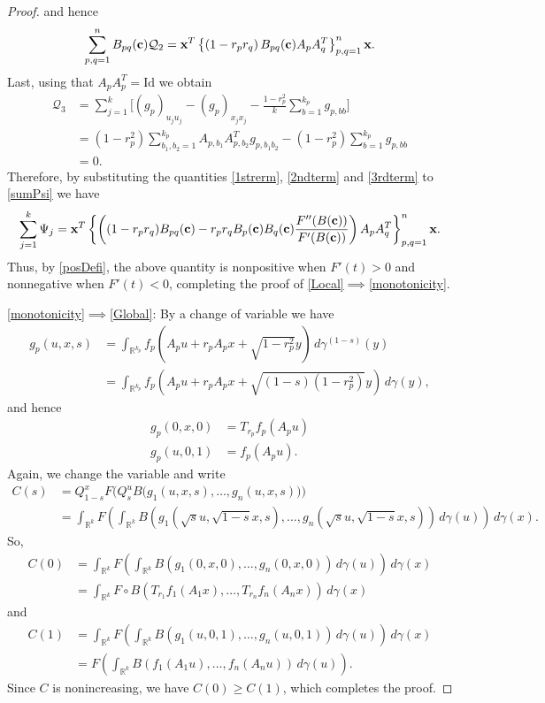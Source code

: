 \documentclass[9pt, a4paper]{amsart}
\newcommand{\R}{\mathbb{R}}
\newcommand{\1}{{\chi_{}}}%
\numberwithin{equation}{section}
\begin{document}
\begin{proof}
and hence
\begin{align}\label{2ndterm}
\sum_{p,q=1}^{n}B_{pq}({\bf{c}})\mathcal{Q}_2={\bf{x}}^T\left\{\left( 1-r_pr_q\right)B_{pq}({\bf{c}})A_pA_q^T  \right\}_{p,q=1}^n{\bf{x}}.
\end{align}
Last, using that $A_pA^T_p=\mathrm{Id}$ we obtain
\begin{align}\label{3rdterm}
	\mathcal{Q}_3&= \sum_{j=1}^k\Big[(g_p)_{u_ju_j}-(g_p)_{x_jx_j}-\frac{1-r_p^2}{k}\sum_{b=1}^{k_p}g_{p,bb}\Big]\\
	&\nonumber=(1-r_p^2)\sum_{b_1, b_2=1}^{k_p} A_{p,b_1}A_{p,b_2}^T g_{p,b_1b_2}-(1-r_p^2)\sum_{b=1}^{k_p}g_{p,bb}\\
	&\nonumber=0.
\end{align}
Therefore, by substituting the quantities \eqref{1strerm}, \eqref{2ndterm} and \eqref{3rdterm} to \eqref{sumPsi} we have
\begin{equation*}
\sum_{j=1}^k\Psi_j={\bf{x}}^T\left\{\left((1-r_pr_q)B_{pq}({\bf{c}})-r_pr_q B_{p}({\bf{c}})B_{q}({\bf{c}}) \frac{F''(B({\bf{c}}))}{F'(B({\bf{c}}))}\right)A_pA_q^T  \right\}_{p,q=1}^n{\bf{x}}.
\end{equation*}
Thus, by \eqref{posDefi}, the above quantity is nonpositive when $F'(t) > 0$ and nonnegative when $F'(t) < 0$, completing the proof of \eqref{Local}$\implies$\eqref{monotonicity}.
		
		\vspace{0.2cm}
		
		\eqref{monotonicity}$\implies$\eqref{Global}:  	By a change of variable we have
		\begin{align*}
g_p(u,x,s)&=\int_{\mathbb{R}^{k_p}} f_p(A_p u + r_p A_p x + \sqrt{1 - r_p^2} y) \, d\gamma^{(1-s)}(y)\\
&=\int_{\R^{k_p}}f_p(A_pu+r_pA_px+\sqrt{(1-s)(1-r_p^2)}y)\,d\gamma (y),
		\end{align*}
and hence  
		\begin{align*}
			g_p(0,x,0)&=T_{r_p}f_p(A_pu)\\
			g_p(u,0,1)&=f_p(A_pu).
		\end{align*}
Again, we change the variable and write
		\begin{align*}
			C(s)&=Q_{1-s}^x F\big(Q_s^uB\big(g_1(u,x,s),\ldots,g_n(u,x,s)\big)\big)\\
			&=\int_{\R^k}F\left(\int_{\R^k}B(g_1(\sqrt{s}u,\sqrt{1-s}x,s),\ldots,g_n(\sqrt{s}u,\sqrt{1-s}x,s))\,d\gamma(u)\right)\,d\gamma(x).
		\end{align*}
		So,
		\begin{align*}
			C(0)&=\int_{\R^k}F\left(\int_{\R^k}B(g_1(0,x,0),\ldots,g_n(0,x,0))\,d\gamma(u)\right)\,d\gamma(x)\\
			&=\int_{\R^k}F\circ B(T_{r_1}f_1(A_1x),\ldots,T_{r_n}f_n(A_nx))\,d\gamma(x)
		\end{align*}
		and
		\begin{align*}
			C(1)&=\int_{\R^k}F\left(\int_{\R^k}B(g_1(u,0,1),\ldots,g_n(u,0,1))\,d\gamma(u)\right)\,d\gamma(x)\\
			&=F\left(\int_{\R^k}B(f_1(A_1u),\ldots,f_n(A_nu))\,d\gamma(u)\right).
		\end{align*}
		Since $C$ is nonincreasing, we have $C(0) \geq C(1)$, which completes the proof.
		

\end{proof}
\end{document}
